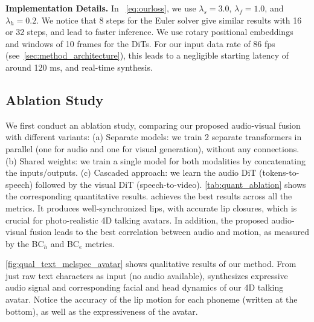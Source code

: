 \noindent
\textbf{Implementation Details.}
In ~\cref{eq:ourloss}, we use $\lambda_s = 3.0$, $\lambda_f = 1.0$, and $\lambda_h = 0.2$. We notice that 8 steps for the Euler solver give similar results with 16 or 32 steps, and lead to faster inference. We use rotary positional embeddings~\cite{su2024roformer} and windows of 10 frames for the DiTs. For our input data rate of 86 fps (see~\cref{sec:method_architecture}), this leads to a negligible starting latency of around 120 ms, and real-time synthesis.







\subsection{Ablation Study}\label{sec:exp_ablation}

We first conduct an ablation study, comparing our proposed audio-visual fusion with different variants: (a) Separate models: we train 2 separate transformers in parallel (one for audio and one for visual generation), without any connections. (b) Shared weights: we train a single model for both modalities by concatenating the inputs/outputs. (c) Cascaded approach: we learn the audio DiT (tokens-to-speech) followed by the visual DiT (speech-to-video). \cref{tab:quant_ablation} shows the corresponding quantitative results. \MethodName achieves the best results across all the metrics. It produces well-synchronized lips, with accurate lip closures, which is crucial for photo-realistic 4D talking avatars. In addition, the proposed audio-visual fusion leads to the best correlation between audio and motion, as measured by the BC$_{h}$ and BC$_{e}$ metrics.

\cref{fig:qual_text_melspec_avatar} shows qualitative results of our method. From just raw text characters as input (no audio available), \MethodName synthesizes expressive audio signal and corresponding facial and head dynamics of our 4D talking avatar. Notice the accuracy of the lip motion for each phoneme (written at the bottom), as well as the expressiveness of the avatar.


